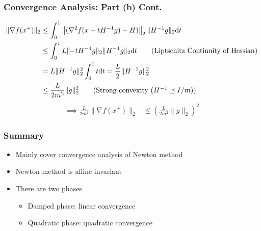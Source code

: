 \documentclass{beamer}
\begin{document}
\begin{frame}
    \frametitle{Convergence Analysis: Part (b) Cont.}
    \begin{align}
    \| \nabla f(x^{+})\|_2 &\leq \int_{0}^{1} \left\| (\nabla^2 f(x-tH^{-1}g) - H)\right\|_2 \|H^{-1}g\|_2 \mathrm{d}t \notag \\
	&\leq \int_{0}^{1} L \| \!\!-\!tH^{-1}g \|_2 \|H^{-1}g\|_2 \mathrm{d}t \tag{Liptschitz Continuity of Hessian} \\
	&= L \|H^{-1}g\|_2^2 \int_{0}^{1} t \mathrm{d}t = \frac{L}{2} \|H^{-1}g\|_2^2 \notag \\	
	&\leq \frac{L}{2m^2} \|g\|_2^2 \tag{Strong convexity ($H^{-1} \preceq I/m$)}
	\end{align}
	\begin{align}
 	\implies \frac{L}{2m^2} \| \nabla f(x^{+})\|_2 &\leq \left( \frac{L}{2m^2} \|g\|_2 \right)^2
    \end{align}
\end{frame}

\begin{frame}
	\frametitle{Summary}
	\begin{itemize}
	\item Mainly cover convergence analysis of Newton method
	\item Newton method is affine invariant
	\item There are two phases
	\begin{itemize}
	\item Damped phase: linear convergence
	\item Quadratic phase: quadratic convergence
	\end{itemize}
	\end{itemize}
\end{frame}
\end{document}
